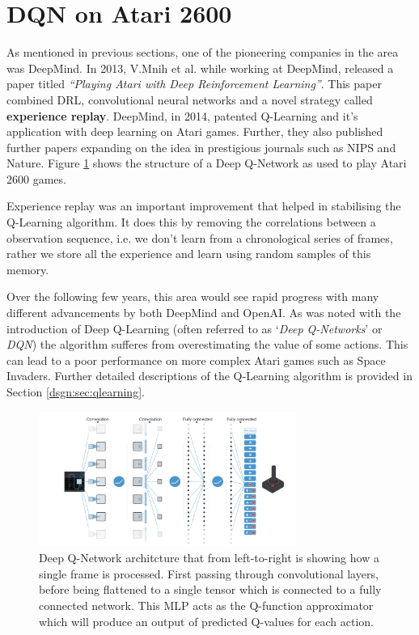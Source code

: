 \section{DQN on Atari 2600}
\label{bg:sec:dqn}
As mentioned in previous sections, one of the pioneering companies in the area was DeepMind. In 2013, V.Mnih et al. while working at DeepMind, released a paper titled \textit{``Playing Atari with Deep Reinforcement Learning''}\cite{dqn}. This paper combined DRL, convolutional neural networks and a novel strategy called \textbf{experience replay}. DeepMind, in 2014, patented Q-Learning and it's application with deep learning on Atari games. Further, they also published further papers expanding on the idea in prestigious journals such as NIPS and Nature. Figure \ref{fig:q-learning-arch} shows the structure of a Deep Q-Network as used to play Atari 2600 games.

Experience replay was an important improvement that helped in stabilising the Q-Learning algorithm. It does this by removing the correlations between a observation sequence, i.e. we don't learn from a chronological series of frames, rather we store all the experience and learn using random samples of this memory.

Over the following few years, this area would see rapid progress with many different advancements by both DeepMind and OpenAI. As was noted with the introduction of Deep Q-Learning (often referred to as `\textit{Deep Q-Networks}' or \textit{DQN}) the algorithm sufferes from overestimating the value of some actions. This can lead to a poor performance on more complex Atari games such as Space Invaders. Further detailed descriptions of the Q-Learning algorithm is provided in Section \ref{dsgn:sec:qlearning}.

\begin{figure}[htbp]
	\centering
	\includegraphics[width=0.75\textwidth]{chapters/chapter2/images/dqn.png}
	\caption[Deep Q-Network architcture]{Deep Q-Network architcture that from left-to-right is showing how a single frame is processed. First passing through convolutional layers, before being flattened to a single tensor which is connected to a fully connected network. This MLP acts as the Q-function approximator which will produce an output of predicted Q-values for each action.
		\label{fig:q-learning-arch}
	}
\end{figure}



